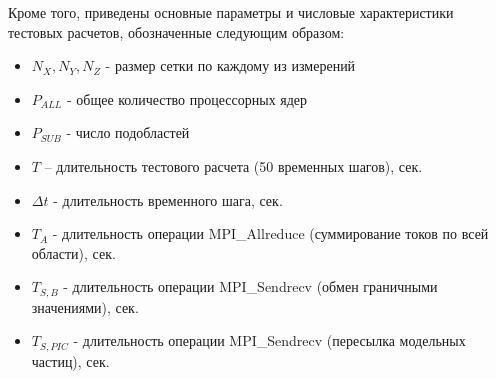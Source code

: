 Кроме того, приведены основные параметры и числовые характеристики тестовых расчетов, обозначенные следующим образом:
\begin{itemize}
	\item $N_X, N_Y, N_Z$  - размер сетки по каждому из измерений
	\item $P_{ALL}$  - общее количество процессорных ядер
	\item $P_{SUB}$  - число подобластей
	\item $T$ – длительность тестового расчета (50 временных шагов), сек.
	\item $\Delta t$  - длительность временного шага, сек.
	\item $T_{A}$ - длительность операции MPI\_Allreduce (суммирование токов по всей области), сек.
	\item $T_{S,B}$ - длительность операции MPI\_Sendrecv (обмен граничными значениями), сек.
	\item $T_{S,PIC}$ - длительность операции MPI\_Sendrecv (пересылка модельных частиц), сек.
\end{itemize}



